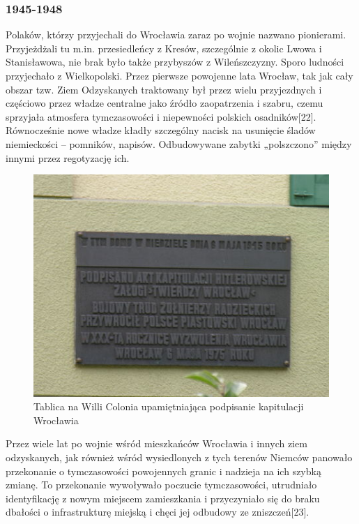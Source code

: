 \documentclass{article}
\begin{document}
\subsubsection{1945-1948}
Polaków, którzy przyjechali do Wrocławia zaraz po wojnie nazwano pionierami. Przyjeżdżali tu m.in. przesiedleńcy z Kresów, szczególnie z okolic Lwowa i Stanisławowa, nie brak było także przybyszów z Wileńszczyzny. Sporo ludności przyjechało z Wielkopolski. Przez pierwsze powojenne lata Wrocław, tak jak cały obszar tzw. Ziem Odzyskanych traktowany był przez wielu przyjezdnych i częściowo przez władze centralne jako źródło zaopatrzenia i szabru, czemu sprzyjała atmosfera tymczasowości i niepewności polskich osadników[22]. Równocześnie nowe władze kładły szczególny nacisk na usunięcie śladów niemieckości – pomników, napisów. Odbudowywane zabytki „polszczono” między innymi przez regotyzację ich.
 \begin{figure}[h!]
\centering
\includegraphics[scale=1]{16.jpg}
\caption{Tablica na Willi Colonia upamiętniająca podpisanie kapitulacji Wrocławia}
\end{figure}
Przez wiele lat po wojnie wśród mieszkańców Wrocławia i innych ziem odzyskanych, jak również wśród wysiedlonych z tych terenów Niemców panowało przekonanie o tymczasowości powojennych granic i nadzieja na ich szybką zmianę. To przekonanie wywoływało poczucie tymczasowości, utrudniało identyfikację z nowym miejscem zamieszkania i przyczyniało się do braku dbałości o infrastrukturę miejską i chęci jej odbudowy ze zniszczeń[23].
\end{document}
